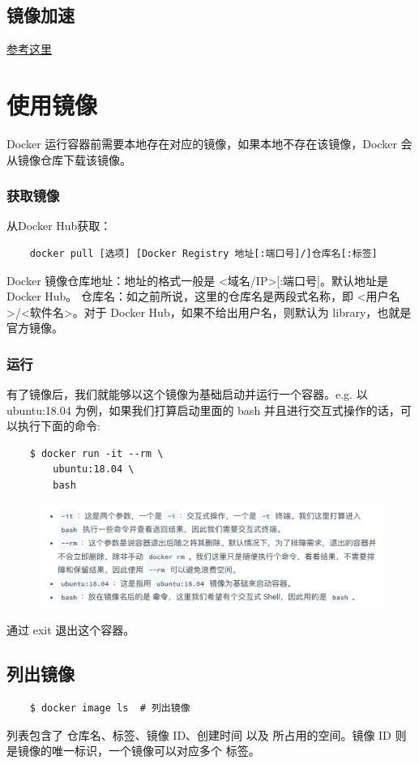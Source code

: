 \documentclass[UTF8]{ctexart}
\begin{document}
\subsection{镜像加速}
\href{https://yeasy.gitbook.io/docker_practice/install/mirror}{参考这里}

\section{使用镜像}
Docker 运行容器前需要本地存在对应的镜像，如果本地不存在该镜像，Docker 会从镜像仓库下载该镜像。

\subsubsection{获取镜像}
从Docker Hub获取：
\begin{lstlisting}
    docker pull [选项] [Docker Registry 地址[:端口号]/]仓库名[:标签]
\end{lstlisting}
Docker 镜像仓库地址：地址的格式一般是 <域名/IP>[:端口号]。默认地址是 Docker Hub。
仓库名：如之前所说，这里的仓库名是两段式名称，即 <用户名>/<软件名>。对于 Docker Hub，如果不给出用户名，则默认为 library，也就是官方镜像。

\subsubsection*{运行}
有了镜像后，我们就能够以这个镜像为基础启动并运行一个容器。e.g. 以 ubuntu:18.04 为例，如果我们打算启动里面的 bash 并且进行交互式操作的话，可以执行下面的命令:
\begin{lstlisting}
    $ docker run -it --rm \
        ubuntu:18.04 \
        bash
\end{lstlisting}
\begin{figure}[htbp]
    \centering
    \includegraphics{docker_run_eg.pdf}
    \caption{}
    \label{}
\end{figure}

通过 exit 退出这个容器。
\subsection{列出镜像}
\begin{lstlisting}
    $ docker image ls  # 列出镜像
\end{lstlisting}
列表包含了 仓库名、标签、镜像 ID、创建时间 以及 所占用的空间。镜像 ID 则是镜像的唯一标识，一个镜像可以对应多个 标签。
\end{document}
